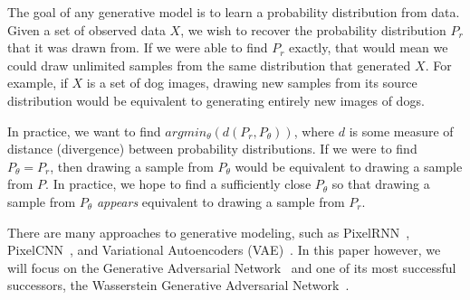 
The goal of any generative model is to learn a probability distribution from data. Given a set of observed data $X$, we wish to recover the probability distribution $P_r$ that it was drawn from. If we were able to find $P_r$ exactly, that would mean we could draw unlimited samples from the same distribution that generated $X$. For example, if $X$ is a set of dog images, drawing new samples from its source distribution would be equivalent to generating entirely new images of dogs. 


In practice, we want to find $argmin_\theta(d(P_r, P_\theta))$, where $d$ is some measure of distance (divergence) between probability distributions. If we were to find $P_\theta=P_r$, then drawing a sample from $P_\theta$ would be equivalent to drawing a sample from $P$. In practice, we hope to find a sufficiently close $P_\theta$ so that drawing a sample from $P_\theta$ \textit{appears} equivalent to drawing a sample from $P_r$.

There are many approaches to generative modeling, such as PixelRNN~\cite{Oord2016}, PixelCNN~\cite{Oord2016a}, and Variational Autoencoders (VAE)~\cite{Pu2016}. In this paper however, we will focus on the Generative Adversarial Network~\cite{Goodfellow2017} and one of its most successful successors, the Wasserstein Generative Adversarial Network~\cite{Arjovsky2017}.